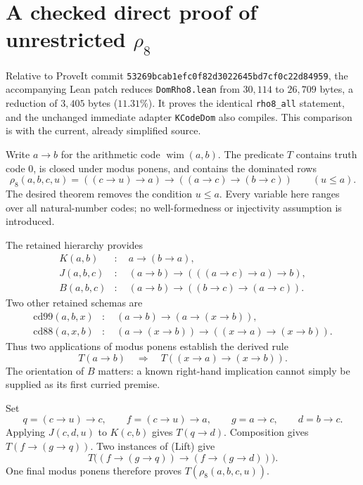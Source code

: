 \section{A checked direct proof of unrestricted \(\rho_8\)}
\label{sec:rho8-direct}

Relative to ProveIt commit
\texttt{53269bcab1efc0f82d3022645bd7cf0c22d84959},
the accompanying Lean patch reduces \texttt{DomRho8.lean} from
\(30{,}114\) to \(26{,}709\) bytes, a reduction of \(3{,}405\) bytes
(\(11.31\%\)). It proves the identical \texttt{rho8\_all} statement,
and the unchanged immediate adapter \texttt{KCodeDom} also compiles.
This comparison is with the current, already simplified source.

Write \(a\to b\) for the arithmetic code \(\operatorname{wim}(a,b)\).
The predicate \(T\) contains truth code \(0\), is closed under modus
ponens, and contains the dominated rows
\[
 \rho_8(a,b,c,u)
 =
 ((c\to u)\to a)\to((a\to c)\to(b\to c))
 \qquad (u\le a).
\]
The desired theorem removes the condition \(u\le a\).
Every variable here ranges over all natural-number codes; no
well-formedness or injectivity assumption is introduced.

The retained hierarchy provides
\[
\begin{aligned}
 K(a,b)&:\quad a\to(b\to a),\\
 J(a,b,c)&:\quad (a\to b)\to(((a\to c)\to a)\to b),\\
 B(a,b,c)&:\quad (a\to b)\to((b\to c)\to(a\to c)).
\end{aligned}
\]
Two other retained schemas are
\[
\begin{aligned}
 \mathrm{cd99}(a,b,x)&:\quad
       (a\to b)\to(a\to(x\to b)),\\
 \mathrm{cd88}(a,x,b)&:\quad
       (a\to(x\to b))\to((x\to a)\to(x\to b)).
\end{aligned}
\]
Thus two applications of modus ponens establish the derived rule
\[
 T(a\to b)\quad\Longrightarrow\quad
 T((x\to a)\to(x\to b)).
 \tag{Lift}
\]
The orientation of \(B\) matters: a known right-hand implication
cannot simply be supplied as its first curried premise.

Set
\[
 q=(c\to u)\to c,\qquad
 f=(c\to u)\to a,\qquad
 g=a\to c,\qquad
 d=b\to c.
\]
Applying \(J(c,d,u)\) to \(K(c,b)\) gives \(T(q\to d)\).
Composition gives \(T(f\to(g\to q))\).
Two instances of \textup{(Lift)} give
\[
 T\bigl((f\to(g\to q))\to(f\to(g\to d))\bigr).
\]
One final modus ponens therefore proves \(T(\rho_8(a,b,c,u))\).


